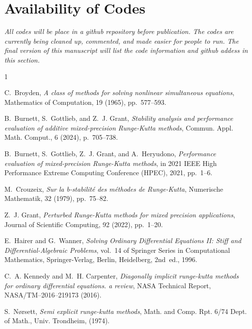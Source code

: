 \documentclass{siamart251104}
\begin{document}
\section*{\sc Availability of Codes}
{\em All codes will be place in a github repository before publication. The codes are currently being
cleaned up, commented, and made easier for people to run. The final version of this manuscript will
list the code information and github addess in this section.
}



\begin{thebibliography}{1}

{\sc C.~Broyden}, {\em A class of methods for solving nonlinear simultaneous
  equations}, Mathematics of Computation, 19 (1965), pp.~577--593.

{\sc B.~Burnett, S.~Gottlieb, and Z.~J. Grant}, {\em Stability analysis and
  performance evaluation of additive mixed-precision {R}unge-{K}utta methods},
  Commun. Appl. Math. Comput., 6 (2024), p.~705–738.

{\sc B.~Burnett, S.~Gottlieb, Z.~J. Grant, and A.~Heryudono}, {\em Performance
  evaluation of mixed-precision {R}unge-{K}utta methods}, in 2021 IEEE High
  Performance Extreme Computing Conference (HPEC), 2021, pp.~1--6.

{\sc M.~Crouzeix}, {\em Sur la b-stabilité des méthodes de {R}unge-{K}utta},
  Numerische Mathematik, 32 (1979), pp.~75--82.

{\sc Z.~J. Grant}, {\em Perturbed {R}unge-{K}utta methods for mixed precision
  applications}, Journal of Scientific Computing, 92 (2022), pp.~1--20.

{\sc E.~Hairer and G.~Wanner}, {\em Solving Ordinary Differential Equations II:
  Stiff and Differential-Algebraic Problems}, vol.~14 of Springer Series in
  Computational Mathematics, Springer-Verlag, Berlin, Heidelberg, 2nd~ed.,
  1996.

{\sc C.~A. Kennedy and M.~H. Carpenter}, {\em Diagonally implicit runge-kutta
  methods for ordinary differential equations. a review}, NASA Technical
  Report, NASA/TM–2016–219173 (2016).

{\sc S.~Nørsett}, {\em Semi explicit runge-kutta methods}, Math. and Comp.
  Rpt. 6/74 Dept. of Math., Univ. Trondheim,  (1974).

\end{thebibliography}
\end{document}
